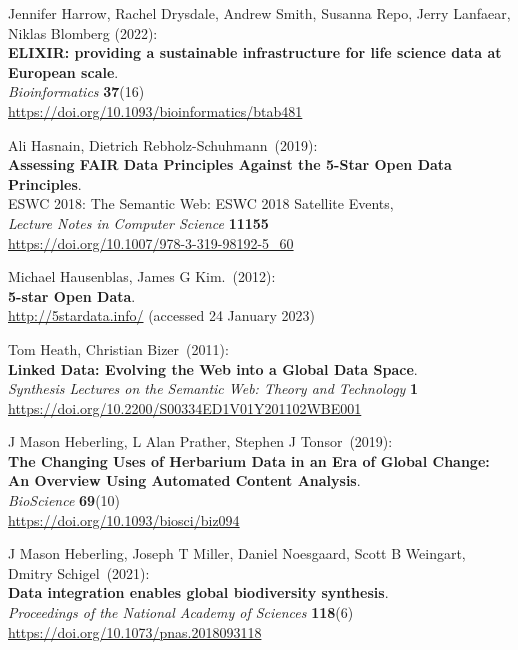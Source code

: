 \begin{thebibliography}{9}
Jennifer Harrow, Rachel Drysdale, Andrew Smith, Susanna Repo, Jerry Lanfaear, Niklas Blomberg (2022): \\
\textbf{ELIXIR: providing a sustainable infrastructure for life science data at European scale}.\\
\emph{Bioinformatics} \textbf{37}(16)\\
\url{https://doi.org/10.1093/bioinformatics/btab481}

Ali Hasnain, Dietrich Rebholz-Schuhmann~(2019): \\
\textbf{Assessing FAIR Data Principles Against the 5-Star Open Data
Principles}.\\
ESWC 2018: The Semantic Web: ESWC 2018 Satellite Events,\\
\emph{Lecture Notes in Computer Science} \textbf{11155}\\
\url{https://doi.org/10.1007/978-3-319-98192-5_60}

Michael Hausenblas, James G Kim.~(2012): \\
\textbf{5-star {Open Data}}. \\
\url{http://5stardata.info/} (accessed 24 January 2023)

Tom Heath, Christian Bizer~(2011): \\
\textbf{Linked Data: Evolving the Web into a Global Data Space}.\\
\emph{Synthesis Lectures on the Semantic Web: Theory and Technology} \textbf{1}\\
\url{https://doi.org/10.2200/S00334ED1V01Y201102WBE001}

J Mason Heberling, L Alan Prather, Stephen J Tonsor~(2019): \\
\textbf{The Changing Uses of Herbarium Data in an Era of Global Change: An Overview
Using Automated Content Analysis}.\\
\emph{BioScience} \textbf{69}(10)\\
\url{https://doi.org/10.1093/biosci/biz094}

J Mason Heberling, Joseph T Miller, Daniel Noesgaard, Scott B Weingart, Dmitry Schigel~(2021): \\
\textbf{Data integration enables global biodiversity
synthesis}.\\
\emph{Proceedings of the National Academy of Sciences} \textbf{118}(6)\\
\url{https://doi.org/10.1073/pnas.2018093118}


\end{thebibliography}
